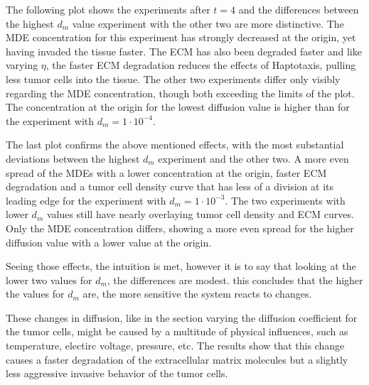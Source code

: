 The following plot shows the experiments after $t=4$ and the differences between the highest $d_m$ value experiment with the other two are more distinctive. The MDE concentration for this experiment has strongly decreased at the origin, yet having invaded the tissue faster. The ECM has also been degraded faster and like varying $\eta$, the faster ECM degradation reduces the effects of Haptotaxis, pulling less tumor cells into the tissue. The other two experiments differ only visibly regarding the MDE concentration, though both exceeding the limits of the plot. The concentration at the origin for the lowest diffusion value is higher than for the experiment with $d_m=1\cdot 10^{-4}$.

The last plot confirms the above mentioned effects, with the most substantial deviations between the highest $d_m$ experiment and the other two. A more even spread of the MDEs with a lower concentration at the origin, faster ECM degradation and a tumor cell density curve that has less of a division at its leading edge for the experiment with $d_m=1\cdot 10^{-3}$. The two experiments with lower $d_m$ values still have nearly overlaying tumor cell density and ECM curves. Only the MDE concentration differs, showing a more even spread for the higher diffusion value with a lower value at the origin. 

Seeing those effects, the intuition is met, however it is to say that looking at the lower two values for $d_m$, the differences are modest. this concludes that the higher the values for $d_m$ are, the more sensitive the system reacts to changes.

These changes in diffusion, like in the section varying the diffusion coefficient for the tumor cells, might be caused by a multitude of physical influences, such as temperature, electirc voltage, pressure, etc. The results show that this change causes a faster degradation of the extracellular matrix molecules but a slightly less aggressive invasive behavior of the tumor cells. 

